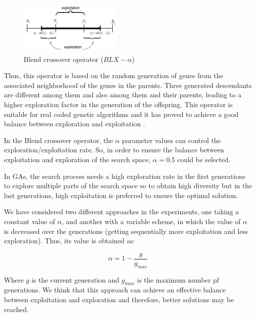\documentclass[conference]{IEEEtran}
\begin{document}
\begin{figure}[!ht]	
	\begin{center}
		\includegraphics[width=5cm]{fig/blxalpha.jpg}
		\caption{Blend crossover operator ($BLX-\alpha$)}
		\label{fig:blxalpha}	
	\end{center}	
\end{figure}

Thus, this operator is based on the random generation of genes from the associated neighborhood of the genes in the parents. Three generated descendants are different among them and also among them and their parents, leading to a higher exploration factor in the generation of the offspring.
This operator is suitable for real coded genetic algorithms and it has proved to achieve a good balance between exploration and exploitation \cite{blx2008}.

In the Blend crossover operator, the $\alpha$ parameter values can control the exploration/exploitation rate. So, in order to ensure the balance between exploitation and exploration of the search space, $\alpha = 0.5$ could be selected.

In GAs, the search process needs a high exploration rate in the first generations to explore multiple parts of the search space so to obtain high diversity but in the last generations, high exploitation is preferred to ensure the optimal solution.

We have considered two different approaches in the experiments, one taking a  constant value of $\alpha$, and another with a variable scheme, in which the value of $\alpha$ is decreased over the generations (getting sequentially more exploitation and less exploration). Thus, its value is obtained as:

\begin{equation}
\label{eqalpha}
\alpha =1-\frac{g}{g_{max}}
\end{equation}

Where $g$ is the current generation and $g_{max}$ is the maximum number pf generations. We think that this approach can achieve an effective balance between exploitation and exploration and therefore, better solutions may be reached.
\end{document}
